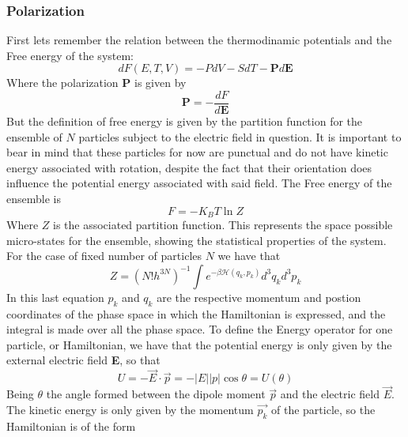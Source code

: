\documentclass{article}
\begin{document}
\subsubsection*{Polarization}
First lets remember the relation between the thermodinamic potentials and the Free energy of the system:
\begin{equation}
    dF(E,T,V) =  -PdV-SdT-\textbf{P}d\textbf{E} 
\end{equation}
Where the polarization \textbf{P} is given by
\begin{equation}
    \textbf{P} = -\frac{dF}{d\textbf{E}}
\end{equation}
But the definition of free energy is given by the partition function for the ensemble of $N$ particles subject to the electric field in question. It is important to bear in mind that these particles for now are punctual and do not have kinetic energy associated with rotation, despite the fact that their orientation does influence the potential energy associated with said field. The Free energy of the ensemble is
\begin{equation}
    F = -K_B T \ln{Z}
\end{equation}
Where $Z$ is the associated partition function. This represents the space possible micro-states for the ensemble, showing the statistical properties of the system. For the case of fixed number of particles $N$ we have that
\begin{equation}
    Z = \left( N! h^{3N}\right)^{-1} \int e^{- \beta \mathcal{H}(q_k,p_k)} d^{3}q_k d^{3}p_k
\label{eq:Z_part}
\end{equation}
In this last equation $p_k$ and $q_k$ are the respective momentum and postion coordinates of the phase space in which the Hamiltonian is expressed, and the integral is made over all the phase space. To define the Energy operator for one particle, or Hamiltonian,  we have that the potential energy is only given by the external electric field \textbf{E}, so that
\begin{equation}
    U = -\Vec{E}\cdot \Vec{p} = -|E||p|\cos \theta = U(\theta) 
\end{equation}
Being $\theta$ the angle formed between the dipole moment $\Vec{p}$ and the electric field $\Vec{E}$. The kinetic energy is only given by the momentum $\vec{p_k}$ of the particle, so the Hamiltonian is of the form
\end{document}
